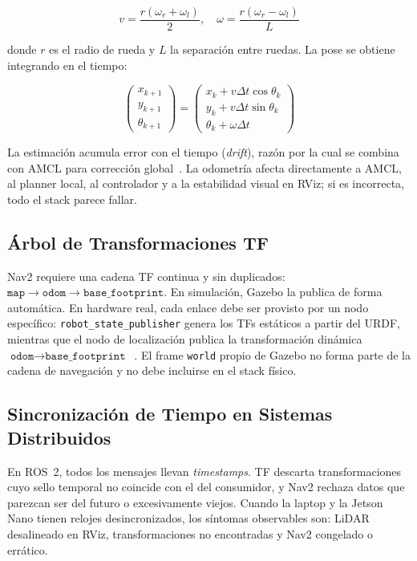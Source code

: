 \documentclass[conference]{IEEEtran}
\begin{document}
\begin{equation}
  v = \frac{r(\omega_r + \omega_l)}{2}, \quad
  \omega = \frac{r(\omega_r - \omega_l)}{L}
\end{equation}

donde $r$ es el radio de rueda y $L$ la separación entre ruedas. La pose se
obtiene integrando en el tiempo:

\begin{equation}
  \begin{pmatrix} x_{k+1} \\ y_{k+1} \\ \theta_{k+1} \end{pmatrix}
  =
  \begin{pmatrix} x_k + v\Delta t \cos\theta_k \\
                  y_k + v\Delta t \sin\theta_k \\
                  \theta_k + \omega\Delta t \end{pmatrix}
\end{equation}

La estimación acumula error con el tiempo (\textit{drift}), razón por la cual
se combina con AMCL para corrección global~\cite{dellaert1999amcl}. La
odometría afecta directamente a AMCL, al planner local, al controlador y a la
estabilidad visual en RViz; si es incorrecta, todo el stack parece fallar.

\subsection{Árbol de Transformaciones TF}

Nav2 requiere una cadena TF continua y sin duplicados:
$\texttt{map} \to \texttt{odom} \to \texttt{base\_footprint}$.
En simulación, Gazebo la publica de forma automática. En hardware real, cada
enlace debe ser provisto por un nodo específico: \texttt{robot\_state\_publisher}
genera los TFs estáticos a partir del URDF, mientras que el nodo de
localización publica la transformación dinámica
$\texttt{odom} \to \texttt{base\_footprint}$~\cite{macenski2022nav2}.
El frame \texttt{world} propio de Gazebo no forma parte de la cadena de
navegación y no debe incluirse en el stack físico.

\subsection{Sincronización de Tiempo en Sistemas Distribuidos}

En ROS~2, todos los mensajes llevan \textit{timestamps}. TF descarta
transformaciones cuyo sello temporal no coincide con el del consumidor, y
Nav2 rechaza datos que parezcan ser del futuro o excesivamente viejos. Cuando
la laptop y la Jetson Nano tienen relojes desincronizados, los síntomas
observables son: LiDAR desalineado en RViz, transformaciones no encontradas y
Nav2 congelado o errático.
\end{document}
